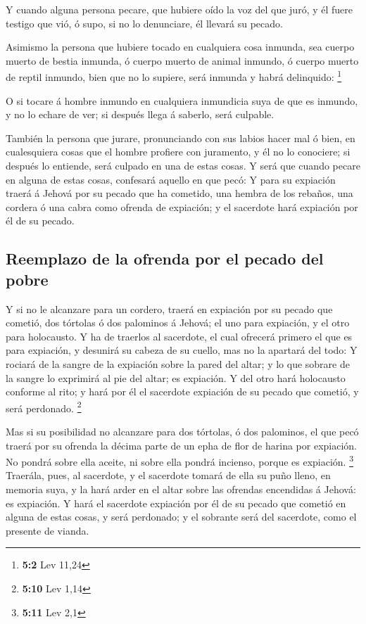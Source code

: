  Y cuando alguna persona pecare, que hubiere oído la voz del
que juró, y él fuere testigo que vió, ó supo, si no lo denunciare, él
llevará su pecado.

 Asimismo la persona que hubiere tocado en cualquiera cosa
inmunda, sea cuerpo muerto de bestia inmunda, ó cuerpo muerto de animal
inmundo, ó cuerpo muerto de reptil inmundo, bien que no lo supiere, será
inmunda y habrá delinquido: \footnote{\textbf{5:2} Lev 11,24}

 O si tocare á hombre inmundo en cualquiera inmundicia suya
de que es inmundo, y no lo echare de ver; si después llega á saberlo,
será culpable.

 También la persona que jurare, pronunciando con sus labios
hacer mal ó bien, en cualesquiera cosas que el hombre profiere con
juramento, y él no lo conociere; si después lo entiende, será culpado en
una de estas cosas.  Y será que cuando pecare en alguna de
estas cosas, confesará aquello en que pecó:  Y para su
expiación traerá á Jehová por su pecado que ha cometido, una hembra de
los rebaños, una cordera ó una cabra como ofrenda de expiación; y el
sacerdote hará expiación por él de su pecado.

\hypertarget{reemplazo-de-la-ofrenda-por-el-pecado-del-pobre}{%
\subsection{Reemplazo de la ofrenda por el pecado del
pobre}\label{reemplazo-de-la-ofrenda-por-el-pecado-del-pobre}}

 Y si no le alcanzare para un cordero, traerá en expiación
por su pecado que cometió, dos tórtolas ó dos palominos á Jehová; el uno
para expiación, y el otro para holocausto.  Y ha de traerlos
al sacerdote, el cual ofrecerá primero el que es para expiación, y
desunirá su cabeza de su cuello, mas no la apartará del todo:
 Y rociará de la sangre de la expiación sobre la pared del
altar; y lo que sobrare de la sangre lo exprimirá al pie del altar; es
expiación.  Y del otro hará holocausto conforme al rito; y
hará por él el sacerdote expiación de su pecado que cometió, y será
perdonado. \footnote{\textbf{5:10} Lev 1,14}

 Mas si su posibilidad no alcanzare para dos tórtolas, ó
dos palominos, el que pecó traerá por su ofrenda la décima parte de un
epha de flor de harina por expiación. No pondrá sobre ella aceite, ni
sobre ella pondrá incienso, porque es expiación. \footnote{\textbf{5:11}
  Lev 2,1}  Traerála, pues, al sacerdote, y el sacerdote
tomará de ella su puño lleno, en memoria suya, y la hará arder en el
altar sobre las ofrendas encendidas á Jehová: es expiación.
 Y hará el sacerdote expiación por él de su pecado que
cometió en alguna de estas cosas, y será perdonado; y el sobrante será
del sacerdote, como el presente de vianda.

